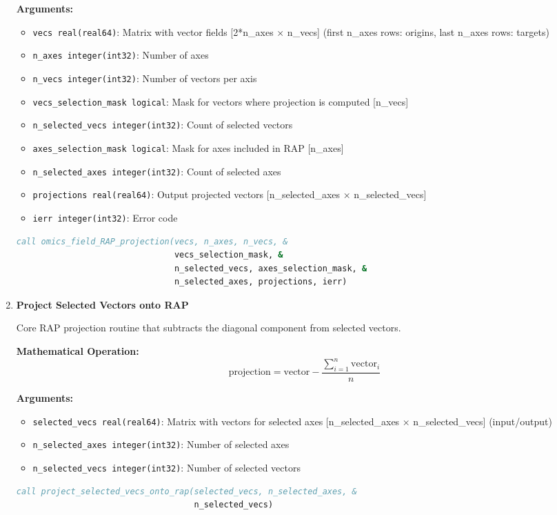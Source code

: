 \begin{enumerate}
    \textbf{Arguments:}
    \begin{itemize}
        \item \texttt{vecs real(real64)}: Matrix with vector fields [2*n\_axes × n\_vecs] (first n\_axes rows: origins, last n\_axes rows: targets)
        \item \texttt{n\_axes integer(int32)}: Number of axes
        \item \texttt{n\_vecs integer(int32)}: Number of vectors per axis
        \item \texttt{vecs\_selection\_mask logical}: Mask for vectors where projection is computed [n\_vecs]
        \item \texttt{n\_selected\_vecs integer(int32)}: Count of selected vectors
        \item \texttt{axes\_selection\_mask logical}: Mask for axes included in RAP [n\_axes]
        \item \texttt{n\_selected\_axes integer(int32)}: Count of selected axes
        \item \texttt{projections real(real64)}: Output projected vectors [n\_selected\_axes × n\_selected\_vecs]
        \item \texttt{ierr integer(int32)}: Error code
    \end{itemize}
\begin{lstlisting}[language=Fortran, caption={Vector Field RAP Projection}]
call omics_field_RAP_projection(vecs, n_axes, n_vecs, &
                                vecs_selection_mask, &
                                n_selected_vecs, axes_selection_mask, &
                                n_selected_axes, projections, ierr)
\end{lstlisting}

    \item \textbf{Project Selected Vectors onto RAP}

    Core RAP projection routine that subtracts the diagonal component from selected vectors.
    
    \textbf{Mathematical Operation:}
    \[ \text{projection} = \text{vector} - \frac{\sum_{i=1}^{n}\text{vector}_i}{n} \]
    
    \textbf{Arguments:}
    \begin{itemize}
        \item \texttt{selected\_vecs real(real64)}: Matrix with vectors for selected axes [n\_selected\_axes × n\_selected\_vecs] (input/output)
        \item \texttt{n\_selected\_axes integer(int32)}: Number of selected axes
        \item \texttt{n\_selected\_vecs integer(int32)}: Number of selected vectors
    \end{itemize}
\begin{lstlisting}[language=Fortran, caption={Core RAP Projection}]
call project_selected_vecs_onto_rap(selected_vecs, n_selected_axes, &
                                    n_selected_vecs)
\end{lstlisting}


\end{enumerate}
